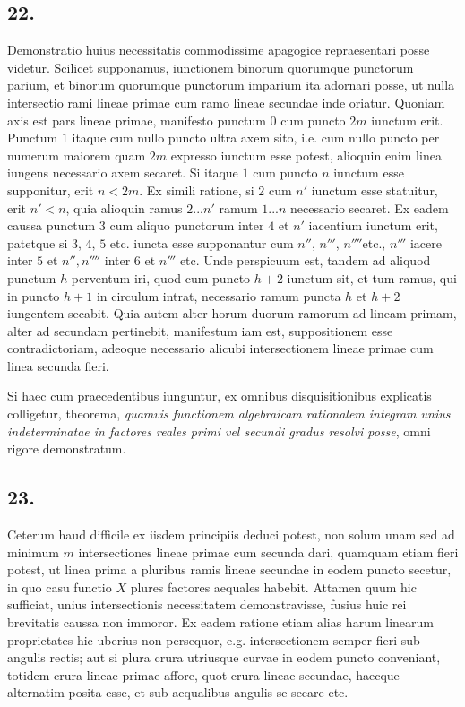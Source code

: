 \documentclass[14pt]{memoir}
\theoremstyle{plain}
\theoremstyle{remark}
\begin{document}
\subsection*{22.}
Demonstratio huius necessitatis commodissime apagogice repraesentari posse videtur. Scilicet supponamus, iunctionem binorum quorumque punctorum parium, et binorum quorumque punctorum imparium ita adornari posse, ut nulla intersectio rami lineae primae cum ramo lineae secundae inde oriatur. Quoniam axis est pars lineae primae, manifesto punctum \(0\) cum puncto \(2m\) iunctum erit. Punctum \(1\) itaque cum nullo puncto ultra axem sito, i.e. cum nullo puncto per numerum maiorem quam \(2m\) expresso iunctum esse potest, alioquin enim linea iungens necessario axem secaret. Si itaque \(1\) cum puncto \(n\) iunctum esse supponitur, erit \(n<2m\). Ex simili ratione, si \(2\) cum \(n'\) iunctum esse statuitur, erit \(n'<n\), quia alioquin ramus \(2...n'\) ramum \(1...n\) necessario secaret. Ex eadem caussa punctum \(3\) cum aliquo punctorum inter \(4\) et \(n'\) iacentium iunctum erit, patetque si \(3\), \(4\), \(5\) etc. iuncta esse supponantur cum \(n''\), \(n'''\), \(n''''\)etc., \(n'''\) iacere inter \(5\) et \(n'', n''''\) inter \(6\) et \(n'''\) etc. Unde perspicuum est, tandem ad aliquod punctum \(h\) perventum iri, quod cum puncto \(h+2\) iunctum sit, et tum ramus, qui in puncto \(h+1\) in circulum intrat, necessario ramum puncta \(h\) et \(h+2\) iungentem secabit. Quia autem alter horum duorum ramorum ad lineam primam, alter ad secundam pertinebit, manifestum iam est, suppositionem esse contradictoriam, adeoque necessario alicubi intersectionem lineae primae cum linea secunda fieri.

Si haec cum praecedentibus iunguntur, ex omnibus disquisitionibus explicatis colligetur, theorema, \textit{quamvis functionem algebraicam rationalem integram unius indeterminatae in factores reales primi vel secundi gradus resolvi posse}, omni rigore demonstratum.


\subsection*{23.} 

Ceterum haud difficile ex iisdem principiis deduci potest, non solum unam sed ad minimum \(m\) intersectiones lineae primae cum secunda dari, quamquam etiam fieri potest, ut linea prima a pluribus ramis lineae secundae in eodem puncto secetur, in quo casu functio \(X\) plures factores aequales habebit. Attamen quum hic sufficiat, unius intersectionis necessitatem demonstravisse, fusius huic rei brevitatis caussa non immoror. Ex eadem ratione etiam alias harum linearum proprietates hic uberius non persequor, e.g. intersectionem semper fieri sub angulis rectis; aut si plura crura utriusque curvae in eodem puncto conveniant, totidem crura lineae primae affore, quot crura lineae secundae, haecque alternatim posita esse, et sub aequalibus angulis se secare etc.
\end{document}
